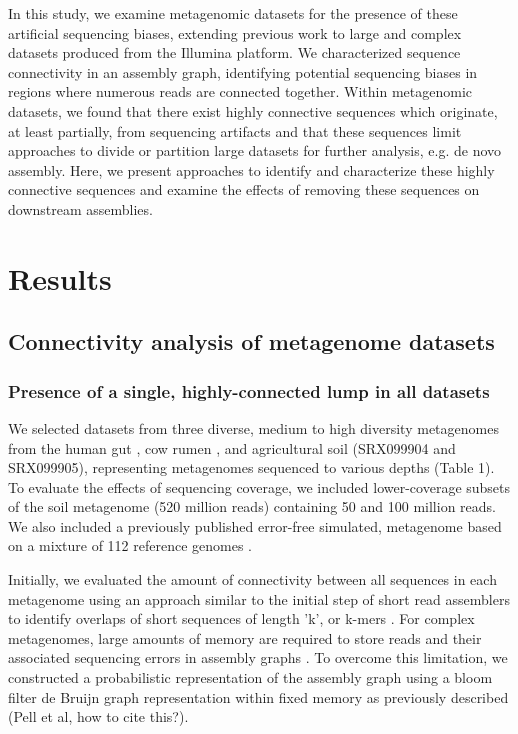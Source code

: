 \documentclass[10pt]{article}
\begin{document}
In this study, we examine metagenomic datasets for the presence of these artificial sequencing biases, extending previous work to large and complex datasets produced from the Illumina platform. We characterized sequence connectivity in an assembly graph, identifying potential sequencing biases in regions where numerous reads are connected together.  Within metagenomic datasets, we found that there exist highly connective sequences which originate, at least partially, from sequencing artifacts and that these sequences limit approaches to divide or partition large datasets for further analysis, e.g. {de novo} assembly.  Here, we present approaches to identify and characterize these highly connective sequences and examine the effects of removing these sequences on downstream assemblies.

\section*{Results}

\subsection*{Connectivity analysis of metagenome datasets}

\subsubsection*{Presence of a single, highly-connected lump in all datasets}
We selected datasets from three diverse, medium to high diversity metagenomes from the human gut \cite{Qin:2010p189}, cow rumen \cite{Hess:2011p686}, and agricultural soil (SRX099904 and SRX099905), representing metagenomes sequenced to various depths (Table 1).  To evaluate the effects of sequencing coverage, we included lower-coverage subsets of the soil metagenome (520 million reads) containing 50 and 100 million reads.  We also included a previously published error-free simulated, metagenome based on a mixture of 112 reference genomes \cite{Pignatelli:2011p742}.

Initially, we evaluated the amount of connectivity between all sequences in each metagenome using an approach similar to the initial step of short read assemblers to identify overlaps of short sequences of length 'k', or k-mers \cite{Peng:2011p898,Simpson:2009p233,Zerbino:2008p665}.  For complex metagenomes, large amounts of memory are required to store reads and their associated sequencing errors in assembly graphs \cite{Hess:2011p686,Mackelprang:2011p1087,Qin:2010p189}.  To overcome this limitation, we constructed a probabilistic representation of the assembly graph using a bloom filter de Bruijn graph representation within fixed memory as previously described (Pell et al, how to cite this?).  
\end{document}

